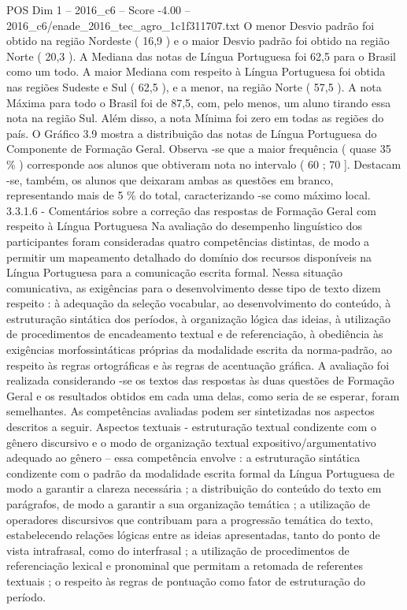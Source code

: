 \begin{textsample}{POS Dim 1 – 2016\_c6 – Score -4.00 – 2016\_c6/enade\_2016\_tec\_agro\_1c1f311707.txt}
O menor Desvio padrão foi obtido na região Nordeste ( 16,9 ) e o maior Desvio padrão foi obtido na região Norte ( 20,3 ).
A Mediana das notas de Língua Portuguesa foi 62,5 para o Brasil como um todo.
A maior Mediana com respeito à Língua Portuguesa foi obtida nas regiões Sudeste e Sul ( 62,5 ), e a menor, na região Norte ( 57,5 ).
A nota Máxima para todo o Brasil foi de 87,5, com, pelo menos, um aluno tirando essa nota na região Sul.
Além disso, a nota Mínima foi zero em todas as regiões do país.
O Gráfico 3.9 mostra a distribuição das notas de Língua Portuguesa do Componente de Formação Geral.
Observa -se que a maior frequência ( quase 35 \% ) corresponde aos alunos que obtiveram nota no intervalo ( 60 ; 70 ].
Destacam -se, também, os alunos que deixaram ambas as questões em branco, representando mais de 5 \% do total, caracterizando -se como máximo local. 3.3.1.6 - Comentários sobre a correção das respostas de Formação Geral com respeito à Língua Portuguesa Na avaliação do desempenho linguístico dos participantes foram consideradas quatro competências distintas, de modo a permitir um mapeamento detalhado do domínio dos recursos disponíveis na Língua Portuguesa para a comunicação escrita formal.
Nessa situação comunicativa, as exigências para o desenvolvimento desse tipo de texto dizem respeito : à adequação da seleção vocabular, ao desenvolvimento do conteúdo, à estruturação sintática dos períodos, à organização lógica das ideias, à utilização de procedimentos de encadeamento textual e de referenciação, à obediência às exigências morfossintáticas próprias da modalidade escrita da norma-padrão, ao respeito às regras ortográficas e às regras de acentuação gráfica.
A avaliação foi realizada considerando -se os textos das respostas às duas questões de Formação Geral e os resultados obtidos em cada uma delas, como seria de se esperar, foram semelhantes.
As competências avaliadas podem ser sintetizadas nos aspectos descritos a seguir.
Aspectos textuais - estruturação textual condizente com o gênero discursivo e o modo de organização textual expositivo/argumentativo adequado ao gênero – essa competência envolve : a estruturação sintática condizente com o padrão da modalidade escrita formal da Língua Portuguesa de modo a garantir a clareza necessária ; a distribuição do conteúdo do texto em parágrafos, de modo a garantir a sua organização temática ; a utilização de operadores discursivos que contribuam para a progressão temática do texto, estabelecendo relações lógicas entre as ideias apresentadas, tanto do ponto de vista intrafrasal, como do interfrasal ; a utilização de procedimentos de referenciação lexical e pronominal que permitam a retomada de referentes textuais ; o respeito às regras de pontuação como fator de estruturação do período.

\end{textsample}
